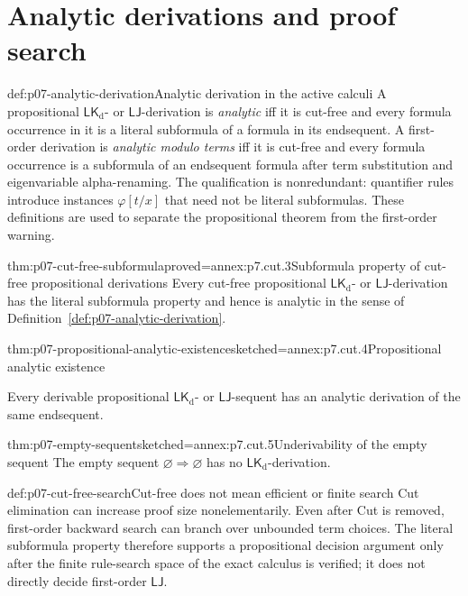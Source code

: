 \section{Analytic derivations and proof search}

\begin{hbdefinition}{def:p07-analytic-derivation}{Analytic derivation in the active calculi}
A propositional \(\mathsf{LK}_{\mathrm d}\)- or \(\mathsf{LJ}\)-derivation
is \emph{analytic} iff it is cut-free and every formula occurrence in it is
a literal subformula of a formula in its endsequent.  A first-order
derivation is \emph{analytic modulo terms} iff it is cut-free and every
formula occurrence is a subformula of an endsequent formula after term
substitution and eigenvariable alpha-renaming.  The qualification is
nonredundant: quantifier rules introduce instances
\(\varphi[t/x]\) that need not
be literal subformulas.  These definitions are used to separate the
propositional theorem from the first-order warning.
\end{hbdefinition}

\begin{hblemma}{thm:p07-cut-free-subformula}{proved=annex:p7.cut.3}{Subformula property of cut-free propositional derivations}
Every cut-free propositional \(\mathsf{LK}_{\mathrm d}\)- or
\(\mathsf{LJ}\)-derivation has the literal subformula property and hence is
analytic in the sense of Definition~\ref{def:p07-analytic-derivation}.
\end{hblemma}

\begin{hbcorollary}{thm:p07-propositional-analytic-existence}{sketched=annex:p7.cut.4}{Propositional analytic existence}
\par\noindent
Every derivable propositional \(\mathsf{LK}_{\mathrm d}\)- or
\(\mathsf{LJ}\)-sequent has an analytic derivation of the same endsequent.
\end{hbcorollary}

\begin{hbcorollary}{thm:p07-empty-sequent}{sketched=annex:p7.cut.5}{Underivability of the empty sequent}
The empty sequent \(\varnothing\Rightarrow\varnothing\) has no
\(\mathsf{LK}_{\mathrm d}\)-derivation.
\end{hbcorollary}

\begin{hbwarning}{def:p07-cut-free-search}{Cut-free does not mean efficient or finite search}
Cut elimination can increase proof size nonelementarily.  Even after Cut is
removed, first-order backward search can branch over unbounded term choices.
The literal subformula property therefore supports a propositional decision
argument only after the finite rule-search space of the exact calculus is
verified; it does not directly decide first-order \(\mathsf{LJ}\).
\end{hbwarning}

